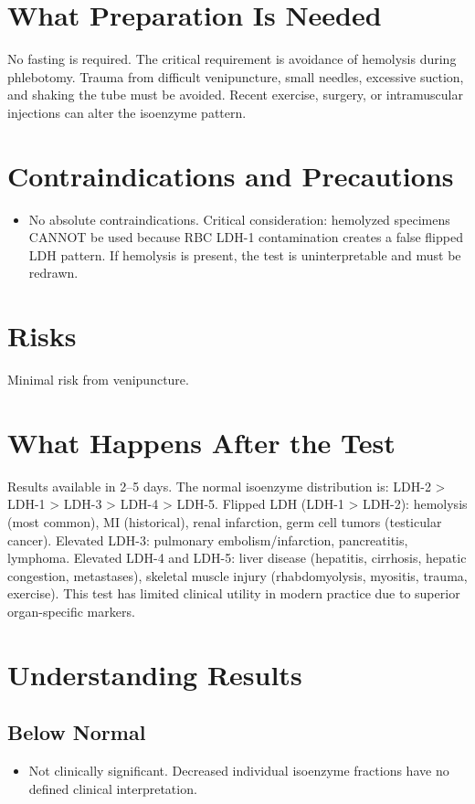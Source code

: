 \section*{What Preparation Is Needed}
No fasting is required. The critical requirement is avoidance of hemolysis during phlebotomy. Trauma from difficult venipuncture, small needles, excessive suction, and shaking the tube must be avoided. Recent exercise, surgery, or intramuscular injections can alter the isoenzyme pattern.

\section*{Contraindications and Precautions}
\begin{itemize}
  \item No absolute contraindications. Critical consideration: hemolyzed specimens CANNOT be used because RBC LDH-1 contamination creates a false flipped LDH pattern. If hemolysis is present, the test is uninterpretable and must be redrawn.
\end{itemize}
\section*{Risks}
Minimal risk from venipuncture.

\section*{What Happens After the Test}
Results available in 2--5 days. The normal isoenzyme distribution is: LDH-2 > LDH-1 > LDH-3 > LDH-4 > LDH-5. Flipped LDH (LDH-1 > LDH-2): hemolysis (most common), MI (historical), renal infarction, germ cell tumors (testicular cancer). Elevated LDH-3: pulmonary embolism/infarction, pancreatitis, lymphoma. Elevated LDH-4 and LDH-5: liver disease (hepatitis, cirrhosis, hepatic congestion, metastases), skeletal muscle injury (rhabdomyolysis, myositis, trauma, exercise). This test has limited clinical utility in modern practice due to superior organ-specific markers.

\section*{Understanding Results}

\subsection*{Below Normal}
\begin{itemize}
  \item Not clinically significant. Decreased individual isoenzyme fractions have no defined clinical interpretation.
\end{itemize}

